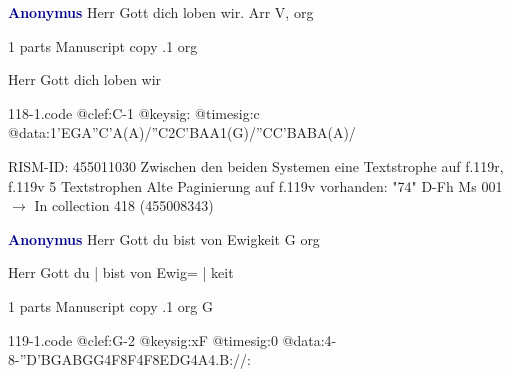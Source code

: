 \documentclass[twocolumn]{book}
\begin{document}
\newline \par \vspace{7pt} \textcolor{darkblue}{\textbf{Anonymus  }}
\newline Herr Gott dich loben wir. Arr    
\newline V, org
\newline \begin{itshape}\end{itshape} 
\newline \textcolor{darkblue}{}  1 parts  
\newline Manuscript copy
.1  org
\newline \begin{footnotesize} Herr Gott dich loben wir \end{footnotesize}  
\begin{filecontents*}{118-1.code}
@clef:C-1
@keysig:
@timesig:c
@data:1'EGA''C'A(A)/''C2C'BAA1(G)/''CC'BABA(A)/
\end{filecontents*}
\newline
%

\newline RISM-ID: 455011030
\newline Zwischen den beiden Systemen eine Textstrophe auf f.119r, f.119v 5 Textstrophen
\newline Alte Paginierung auf f.119v vorhanden: "74"
\newline D-Fh  Ms 001
\newline $\rightarrow$ In collection 418 (455008343)

\newline \par \vspace{7pt} \textcolor{darkblue}{\textbf{Anonymus  }}
\newline Herr Gott du bist von Ewigkeit  G  
\newline org
\newline \begin{itshape}[f.71v, at left:] Herr Gott du | bist von Ewig= | keit\end{itshape} 
\newline \textcolor{darkblue}{}  1 parts  
\newline Manuscript copy
.1  org  G  
\begin{filecontents*}{119-1.code}
@clef:G-2
@keysig:xF
@timesig:0
@data:4-8-''D{'BGAB}{GG}4F8F4F8E{DG}4A4.B://:
\end{filecontents*}
\newline
%
\end{document}
